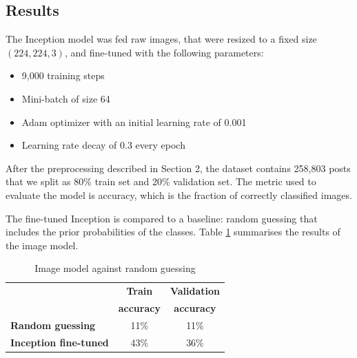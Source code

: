 \documentclass{article} %
\begin{document}
\subsection{Results}
The Inception model was fed raw images, that were resized to a fixed size $(224, 224, 3)$, and fine-tuned with the following parameters:
\begin{itemize}[topsep=0pt]
    \item 9,000 training steps
    \item Mini-batch of size 64
    \item Adam optimizer with an initial learning rate of 0.001
    \item Learning rate decay of 0.3 every epoch
\end{itemize}

After the preprocessing described in Section 2, the dataset contains 258,803 posts that we split as 80\% train set and 20\% validation set. The metric used to evaluate the model is accuracy, which is the fraction of correctly classified images.

The fine-tuned Inception is compared to a baseline: random guessing that includes the prior probabilities of the classes. Table \ref{image-results} summarises the results of the image model.

\begin{table}[H]
\caption{Image model against random guessing}
\begin{center}
    \begin{tabular}{ l | c | c}
    & \textbf{Train} & \textbf{Validation} \\
    & \textbf{accuracy} & \textbf{accuracy} \\ \hline
    \textbf{Random guessing} & 11\% & 11\% \\ \hline
    \textbf{Inception fine-tuned}  & 43\% & 36\% \\
    \end{tabular}
\end{center}
\label{image-results}
\end{table}
\end{document}
